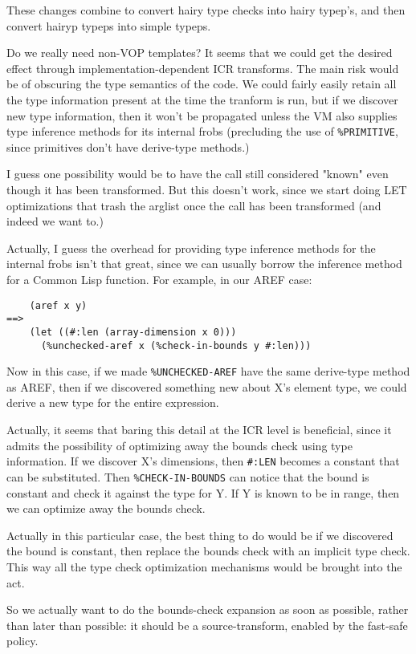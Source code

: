 These changes combine to convert hairy type checks into hairy typep's, and then
convert hairyp typeps into simple typeps.


Do we really need non-VOP templates? It seems that we could get the
desired effect through implementation-dependent ICR transforms. The
main risk would be of obscuring the type semantics of the code. We
could fairly easily retain all the type information present at the
time the tranform is run, but if we discover new type information,
then it won't be propagated unless the VM also supplies type inference
methods for its internal frobs (precluding the use of
\verb|%PRIMITIVE|, since primitives don't have derive-type methods.)

I guess one possibility would be to have the call still considered "known" even
though it has been transformed.  But this doesn't work, since we start doing
LET optimizations that trash the arglist once the call has been transformed
(and indeed we want to.)

Actually, I guess the overhead for providing type inference methods for the
internal frobs isn't that great, since we can usually borrow the inference
method for a Common Lisp function.  For example, in our AREF case:

\begin{verbatim}
    (aref x y)
==>
    (let ((#:len (array-dimension x 0)))
      (%unchecked-aref x (%check-in-bounds y #:len)))  
\end{verbatim}

Now in this case, if we made \verb|%UNCHECKED-AREF| have the same
derive-type method as AREF, then if we discovered something new about
X's element type, we could derive a new type for the entire
expression.

Actually, it seems that baring this detail at the ICR level is
beneficial, since it admits the possibility of optimizing away the bounds
check using type information. If we discover X's dimensions, then
\verb|#:LEN| becomes a constant that can be substituted. Then
\verb|%CHECK-IN-BOUNDS| can notice that the bound is constant and
check it against the type for Y. If Y is known to be in range, then we
can optimize away the bounds check.

Actually in this particular case, the best thing to do would be if we
discovered the bound is constant, then replace the bounds check with an
implicit type check.  This way all the type check optimization mechanisms would
be brought into the act.

So we actually want to do the bounds-check expansion as soon as possible,
rather than later than possible: it should be a source-transform, enabled by
the fast-safe policy.

